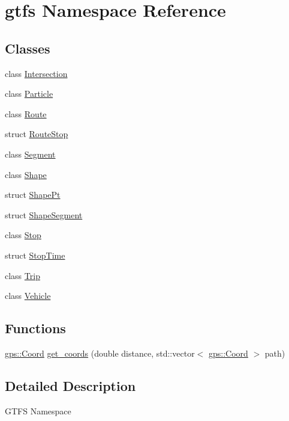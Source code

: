 \hypertarget{namespacegtfs}{}\section{gtfs Namespace Reference}
\label{namespacegtfs}
\subsection*{Classes}
\begin{DoxyCompactItemize}
\item 
class \hyperlink{classgtfs_1_1Intersection}{Intersection}
\item 
class \hyperlink{classgtfs_1_1Particle}{Particle}
\item 
class \hyperlink{classgtfs_1_1Route}{Route}
\item 
struct \hyperlink{structgtfs_1_1RouteStop}{Route\+Stop}
\item 
class \hyperlink{classgtfs_1_1Segment}{Segment}
\item 
class \hyperlink{classgtfs_1_1Shape}{Shape}
\item 
struct \hyperlink{structgtfs_1_1ShapePt}{Shape\+Pt}
\item 
struct \hyperlink{structgtfs_1_1ShapeSegment}{Shape\+Segment}
\item 
class \hyperlink{classgtfs_1_1Stop}{Stop}
\item 
struct \hyperlink{structgtfs_1_1StopTime}{Stop\+Time}
\item 
class \hyperlink{classgtfs_1_1Trip}{Trip}
\item 
class \hyperlink{classgtfs_1_1Vehicle}{Vehicle}
\end{DoxyCompactItemize}
\subsection*{Functions}
\begin{DoxyCompactItemize}
\item 
\hyperlink{classgps_1_1Coord}{gps\+::\+Coord} \hyperlink{namespacegtfs_aab5513b6c15b5c30de5f706a2e587ae4}{get\+\_\+coords} (double distance, std\+::vector$<$ \hyperlink{classgps_1_1Coord}{gps\+::\+Coord} $>$ path)
\end{DoxyCompactItemize}


\subsection{Detailed Description}
G\+T\+FS Namespace

